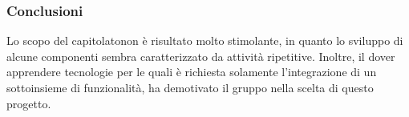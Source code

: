 \subsubsection{Conclusioni}
Lo scopo del capitolato\glosp non è risultato molto stimolante, in quanto lo
sviluppo di alcune componenti sembra caratterizzato da attività ripetitive.
Inoltre, il dover apprendere tecnologie per le quali è richiesta solamente 
l'integrazione di un sottoinsieme di funzionalità, ha demotivato il gruppo nella scelta di questo progetto.

